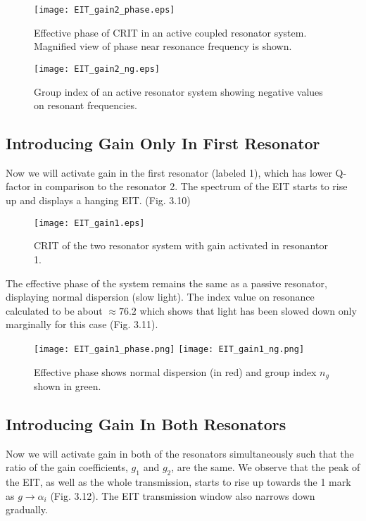 \begin{figure}[h]
\centering
\texttt{[image: EIT\_gain2\_phase.eps]}
\caption{Effective phase of CRIT in an active coupled resonator system. Magnified view of phase near resonance frequency is shown.}
\end{figure}

     
\begin{figure}[h]
\centering
\texttt{[image: EIT\_gain2\_ng.eps]}
\caption{Group index of an active resonator system showing negative values on resonant frequencies.}
\end{figure}


\subsection{Introducing Gain Only In First Resonator}
Now we will activate gain in the first resonator (labeled 1), which has lower Q-factor in comparison to the resonator 2. The spectrum of the EIT starts to rise up and displays a hanging EIT. (Fig. 3.10)

\begin{figure}[h]
\centering
\texttt{[image: EIT\_gain1.eps]}
\caption{CRIT of the two resonator system with gain activated in resonantor 1.}
\end{figure}

The effective phase of the system remains the same as a passive resonator, displaying normal dispersion (slow light). The index value on resonance calculated to be about $\approx 76.2$ which shows that light has been slowed down only marginally for this case (Fig. 3.11). 

\begin{figure}[h]
\texttt{[image: EIT\_gain1\_phase.png]}
\texttt{[image: EIT\_gain1\_ng.png]}
\caption{Effective phase shows normal dispersion (in red) and group index $n_{g}$ shown in green.}
\end{figure}


\subsection{Introducing Gain In Both Resonators}
Now we will activate gain in both of the resonators simultaneously such that the ratio of the gain coefficients, $g_{1}$ and $g_{2}$, are the same. We observe that the peak of the EIT, as well as the whole transmission, starts to rise up towards the 1 mark as $g \to \alpha_{i}$ (Fig. 3.12). The EIT transmission window also narrows down gradually.

